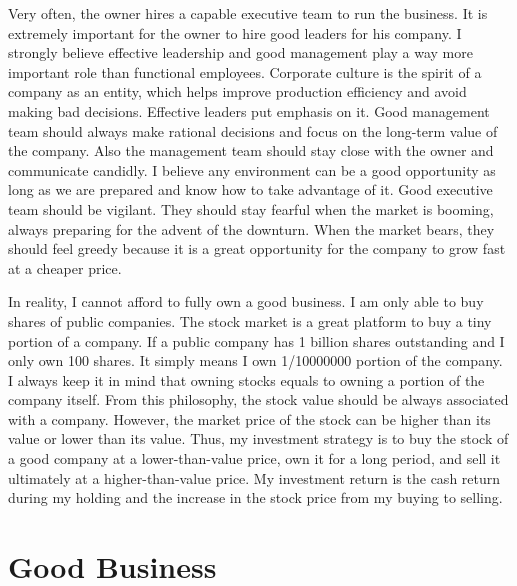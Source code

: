 \documentclass[11pt]{article}
\begin{document}
Very often, the owner hires a capable executive team to run the business. It is extremely important for the owner to hire good leaders for his company. I strongly believe effective leadership and good management play a way more important role than functional employees. Corporate culture is the spirit of a company as an entity, which helps improve production efficiency and avoid making bad decisions. Effective leaders put emphasis on it. Good management team should always make rational decisions and focus on the long-term value of the company. Also the management team should stay close with the owner and communicate candidly. I believe any environment can be a good opportunity as long as we are prepared and know how to take advantage of it. Good executive team should be vigilant. They should stay fearful when the market is booming, always preparing for the advent of the downturn. When the market bears, they should feel greedy because it is a great opportunity for the company to grow fast at a cheaper price.

In reality, I cannot afford to fully own a good business. I am only able to buy shares of public companies. The stock market is a great platform to buy a tiny portion of a company. If a public company has 1 billion shares outstanding and I only own 100 shares. It simply means I own 1/10000000 portion of the company. I always keep it in mind that owning stocks equals to owning a portion of the company itself. From this philosophy, the stock value should be always associated with a company. However, the market price of the stock can be higher than its value or lower than its value. Thus, my investment strategy is to buy the stock of a good company at a lower-than-value price, own it for a long period, and sell it ultimately at a higher-than-value price. My investment return is the cash return during my holding and the increase in the stock price from my buying to selling.            
 
\section{Good Business}
\end{document}
